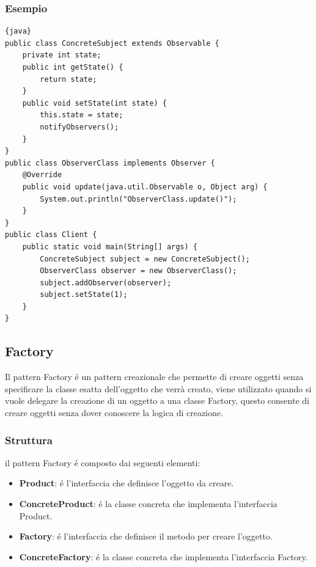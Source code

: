 \documentclass[11pt]{article}
\begin{document}
        \subsubsection{Esempio}
\begin{lstlisting}{java}
public class ConcreteSubject extends Observable {
    private int state;
    public int getState() {
        return state;
    }
    public void setState(int state) {
        this.state = state;
        notifyObservers();
    }
}
public class ObserverClass implements Observer {
    @Override
    public void update(java.util.Observable o, Object arg) {
        System.out.println("ObserverClass.update()");
    }
}
public class Client {
    public static void main(String[] args) {
        ConcreteSubject subject = new ConcreteSubject();
        ObserverClass observer = new ObserverClass();
        subject.addObserver(observer);
        subject.setState(1);
    }
}
\end{lstlisting}
\subsection{Factory}
Il pattern Factory é un pattern creazionale che permette di creare oggetti senza specificare la classe esatta dell'oggetto che verrà creato,
viene utilizzato quando si vuole delegare la creazione di un oggetto a una classe Factory, questo consente di creare oggetti senza dover conoscere la logica di creazione.
\subsubsection{Struttura}
il pattern Factory é composto dai seguenti elementi:
\begin{itemize}
    \item \textbf{Product}: é l'interfaccia che definisce l'oggetto da creare.
    \item \textbf{ConcreteProduct}: é la classe concreta che implementa l'interfaccia Product.
    \item \textbf{Factory}: é l'interfaccia che definisce il metodo per creare l'oggetto.
    \item \textbf{ConcreteFactory}: é la classe concreta che implementa l'interfaccia Factory.
    \end{itemize}
\end{document}

